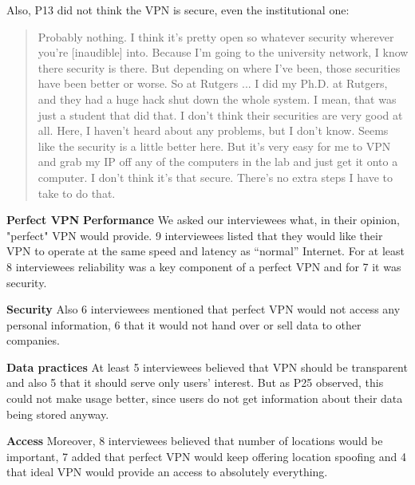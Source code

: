 Also, P13 did not think the VPN is secure, even the institutional one:
\begin{quote}Probably nothing. I think it's pretty open so whatever security
wherever you're [inaudible] into. Because I'm going to the university network,
I know there security is there. But depending on where I've been, those
securities have been better or worse. So at Rutgers ... I did my Ph.D. at
Rutgers, and they had a huge hack shut down the whole system. I mean, that was
just a student that did that. I don't think their securities are very good at
all. Here, I haven't heard about any problems, but I don't know. Seems like
the security is a little better here. But it's very easy for me to VPN and
grab my IP off any of the computers in the lab and just get it onto a
computer. I don't think it's that secure. There's no extra steps I have to
take to do that.\end{quote}



\textbf{Perfect VPN} \textbf{Performance} We asked our interviewees what, in
their opinion, "perfect" VPN would provide. 9 interviewees listed that they
would like their VPN to operate at the same speed and latency as  “normal”
Internet. For at least 8 interviewees reliability was a key component of a
perfect VPN and for 7 it was security. 

\textbf{Security} Also 6 interviewees mentioned that perfect VPN would not
access any personal information, 6 that it would not hand over or sell data to
other companies. 

\textbf{Data practices} At least 5 interviewees believed that VPN should be
transparent and also 5 that it should serve only users' interest. But as P25
observed, this could not make usage better, since users do not get information
about their data being stored anyway.


\textbf{Access} Moreover, 8 interviewees believed that number of locations
would be important, 7 added that perfect VPN would keep offering location
spoofing and 4 that ideal VPN would provide an access to absolutely
everything.

